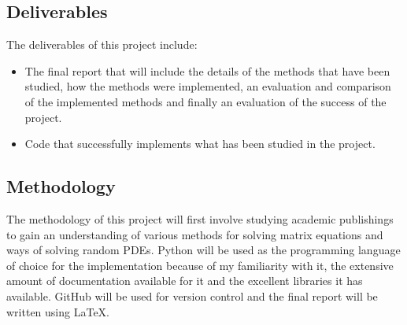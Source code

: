 \documentclass[11pt]{article}
\numberwithin{equation}{section}
\begin{document}
\subsection{Deliverables}
The deliverables of this project include:
\begin{itemize}
\item The final report that will include the details of the methods that have been studied, how the methods were implemented, an evaluation and comparison of the implemented methods and finally an evaluation of the success of the project.  
\item Code that successfully implements what has been studied in the project.
\end{itemize}

\subsection{Methodology}
The methodology of this project will first involve studying academic publishings to gain an understanding of various methods for solving matrix equations and ways of solving random PDEs. Python will be used as the programming language of choice for the implementation because of my familiarity with it, the extensive amount of documentation available for it and the excellent libraries it has available. GitHub will be used for version control and the final report will be written using \LaTeX. 

%
%
\end{document}
